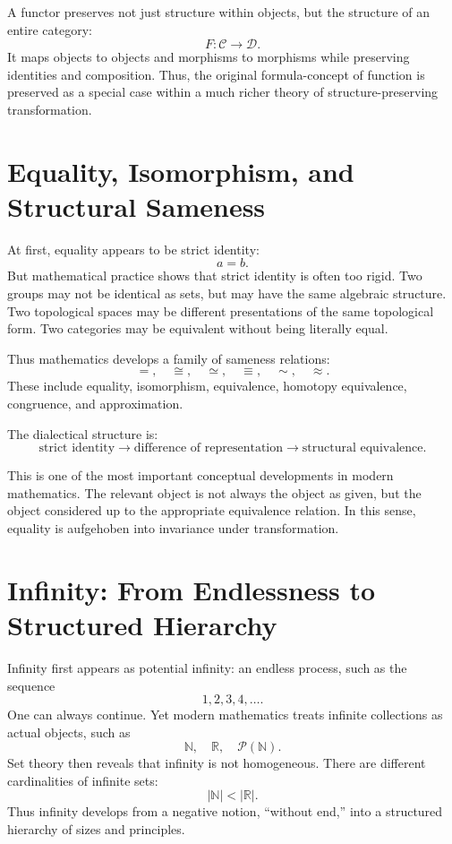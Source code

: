 \documentclass[11pt]{article}
\begin{document}
A functor preserves not just structure within objects, but the structure of an entire category:
\[
F:\mathcal{C}\to\mathcal{D}.
\]
It maps objects to objects and morphisms to morphisms while preserving identities and composition. Thus, the original formula-concept of function is preserved as a special case within a much richer theory of structure-preserving transformation.

\section{Equality, Isomorphism, and Structural Sameness}

At first, equality appears to be strict identity:
\[
a=b.
\]
But mathematical practice shows that strict identity is often too rigid. Two groups may not be identical as sets, but may have the same algebraic structure. Two topological spaces may be different presentations of the same topological form. Two categories may be equivalent without being literally equal.

Thus mathematics develops a family of sameness relations:
\[
=,\quad \cong,\quad \simeq,\quad \equiv,\quad \sim,\quad \approx.
\]
These include equality, isomorphism, equivalence, homotopy equivalence, congruence, and approximation.

The dialectical structure is:
\[
\text{strict identity}
\longrightarrow
\text{difference of representation}
\longrightarrow
\text{structural equivalence}.
\]

This is one of the most important conceptual developments in modern mathematics. The relevant object is not always the object as given, but the object considered up to the appropriate equivalence relation. In this sense, equality is aufgehoben into invariance under transformation.

\section{Infinity: From Endlessness to Structured Hierarchy}

Infinity first appears as potential infinity: an endless process, such as the sequence
\[
1,2,3,4,\dots.
\]
One can always continue. Yet modern mathematics treats infinite collections as actual objects, such as
\[
\mathbb{N}, \quad \mathbb{R}, \quad \mathcal{P}(\mathbb{N}).
\]
Set theory then reveals that infinity is not homogeneous. There are different cardinalities of infinite sets:
\[
|\mathbb{N}| < |\mathbb{R}|.
\]
Thus infinity develops from a negative notion, ``without end,'' into a structured hierarchy of sizes and principles.
\end{document}
